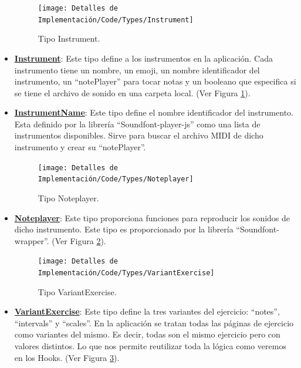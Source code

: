 \documentclass[12pt,twoside,titlepage]{report}
\begin{document}
\begin{itemize}
    \begin{figure}[H]
        \centering
        \texttt{[image: Detalles de Implementación/Code/Types/Instrument]}
        \caption{Tipo Instrument.}
        \label{fig:Instrument}
    \end{figure}

    \item \href{https://github.com/alberttogoca/EarFit/blob/main/src/types/index.ts}{\textbf{Instrument}}: Este tipo define a los instrumentos en la aplicación. Cada instrumento tiene un nombre, un emoji, un nombre identificador del instrumento, un ``notePlayer'' para tocar notas y un booleano que especifica si se tiene el archivo de sonido en una carpeta local. (Ver Figura \ref{fig:Instrument}).
    \item \href{https://github.com/alberttogoca/EarFit/blob/main/src/types/index.ts}{\textbf{InstrumentName}}: Este tipo define el nombre identificador del instrumento. Esta definido por la librería ``Soundfont-player-js'' como una lista de instrumentos disponibles. Sirve para buscar el archivo MIDI de dicho instrumento y crear su ``notePlayer''. %
    
    \begin{figure}[H]
        \centering
        \texttt{[image: Detalles de Implementación/Code/Types/Noteplayer]}
        \caption{Tipo Noteplayer.}
        \label{fig:Noteplayer}
    \end{figure}

    \item \href{https://github.com/alberttogoca/EarFit/blob/main/src/types/index.ts}{\textbf{Noteplayer}}: Este tipo proporciona funciones para reproducir los sonidos de dicho instrumento. Este tipo es proporcionado por la librería ``Soundfont-wrapper''. (Ver Figura \ref{fig:Noteplayer}).

    \begin{figure}[H]
        \centering
        \texttt{[image: Detalles de Implementación/Code/Types/VariantExercise]}
        \caption{Tipo VariantExercise.}
        \label{fig:VariantExercise}
    \end{figure}

    \item \href{https://github.com/alberttogoca/EarFit/blob/main/src/types/index.ts}{\textbf{VariantExercise}}: Este tipo define la tres variantes del ejercicio: ``notes'', ``intervals'' y ``scales''. En la aplicación se tratan todas las páginas de ejercicio como variantes del mismo. Es decir, todas son el mismo ejercicio pero con valores distintos. Lo que nos permite reutilizar toda la lógica como veremos en los Hooks.
    (Ver Figura \ref{fig:VariantExercise}).


\end{itemize}
\end{document}
